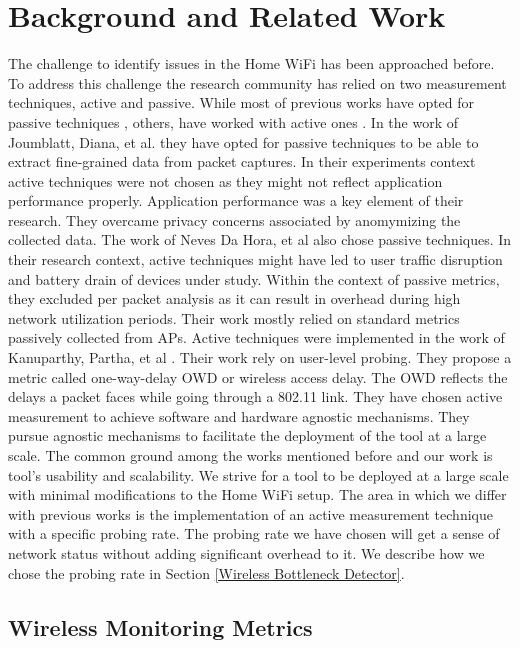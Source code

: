 \section{Background and Related Work}\label{Back_Related_Work}

The challenge to identify issues in the Home WiFi has been approached before. To address this challenge the research community has relied on two measurement techniques, active and passive. While most of previous works have opted for passive techniques \cite{hostview} \cite{passive_wifi_capacity_estimation}, others, have worked with active ones \cite{can_user_level_probing}. In the work of Joumblatt, Diana, et al. \cite{hostview} they have opted for passive techniques to be able to extract fine-grained data from packet captures. In their experiments context active techniques were not chosen as they might not reflect application performance properly. Application performance was a key element of their research. They overcame privacy concerns associated by anomymizing the collected data. The work of Neves Da Hora, et al \cite{passive_wifi_capacity_estimation} also chose passive techniques. In their research context, active techniques might have led to user traffic disruption and battery drain of devices under study. Within the context of passive metrics, they excluded per packet analysis as it can result in overhead during high network utilization periods. Their work mostly relied on standard metrics passively collected from APs.
Active techniques were implemented in the work of Kanuparthy, Partha, et al \cite{can_user_level_probing}. Their work rely on user-level probing. They propose a metric called one-way-delay OWD or wireless access delay. The OWD reflects the delays a packet faces while going through a 802.11 link. They have chosen active measurement to achieve software and hardware agnostic mechanisms. They pursue agnostic mechanisms to facilitate the deployment of the tool at a large scale. The common ground among the works mentioned before and our work is tool's usability and scalability. We strive for a tool to be deployed at a large scale with minimal modifications to the Home WiFi setup. The area in which we differ with previous works is the implementation of an active measurement technique with a specific probing rate. The probing rate we have chosen will get a sense of network status without adding significant overhead to it. We describe how we chose the probing rate in Section \ref{Wireless Bottleneck Detector}.


\subsection{Wireless Monitoring Metrics}\label{Wireless Monitoring Metrics}

